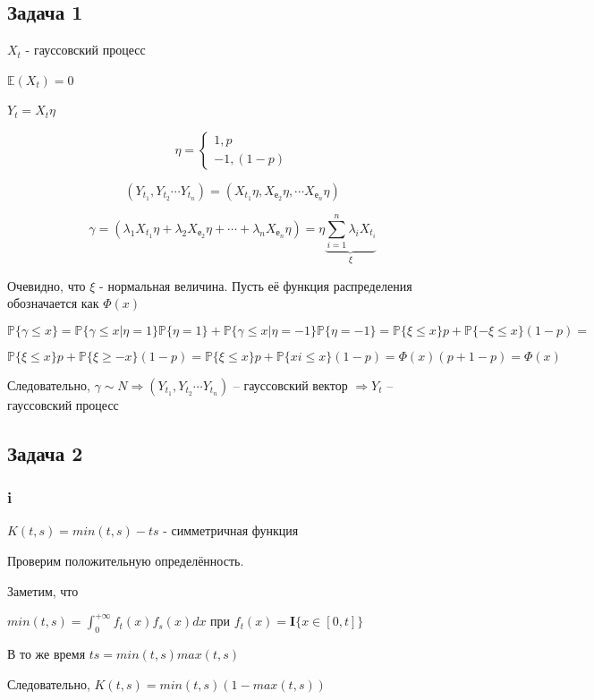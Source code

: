 \documentclass[a4paper,12pt]{article}
\def \mbf{\mathbf}
\def \mbb{\mathbb}
\def \P{\mbb{P}}
\def \E{\mbb{E}}
\def \I{\mbf{I}}
\begin{document}
\subsection{Задача 1}

$ X_t $ - гауссовский процесс

$ \E(X_t) = 0 $

$ Y_t = X_t\eta $

\[   \eta = \begin{cases}
1, p\\
-1, (1-p)
\end{cases}  \]

\[ (Y_{t_1}, Y_{t_2} \cdots Y_{t_n}) = (X_{t_1}\eta, X_{е_2}\eta, \cdots X_{е_n}\eta) \]

\[ \gamma =(\lambda_1 X_{t_1}\eta + \lambda_2 X_{е_2}\eta + \cdots + \lambda_n X_{е_n}\eta) = \eta \underbrace{ \sum_{i = 1}^{n}\lambda_i X_{t_i} }_{\xi} \]

Очевидно, что $ \xi $ - нормальная величина. Пусть её функция распределения обозначается как $ \Phi(x) $

\[ \P\{\gamma \le x\} = \P\{\gamma \le x | \eta = 1\} \P\{\eta = 1\} +  \P\{\gamma \le x | \eta = -1\} \P\{\eta = -1\} = \P\{ \xi \le x \}p + \P\{ -\xi \le x \}(1-p) = \] 

\[ \P\{ \xi \le x \}p + \P\{ \xi \ge -x \}(1-p) =  \P\{ \xi \le x \}p + \P\{ xi \le  x \}(1-p)  = \Phi(x)(p + 1 - p) = \Phi(x)\]

Следовательно, $ \gamma \sim N \Rightarrow  (Y_{t_1}, Y_{t_2} \cdots Y_{t_n}) $ -- гауссовский вектор $ \Rightarrow Y_t $ -- гауссовский процесс 


\subsection{Задача 2}

\subsubsection{i}

$ K(t,s) = min(t,s) - ts $ - симметричная функция

Проверим положительную определённость.

Заметим, что 

$ min(t,s) = \int_{0}^{+\infty} f_t(x) f_s(x) dx  $ при   $ f_t(x) = \I\{ x \in [0,t] \} $

В то же время $ ts = min(t,s)max(t,s)$

Следовательно, $  K(t,s) = min(t,s)(1-max(t,s)) $
\end{document}
